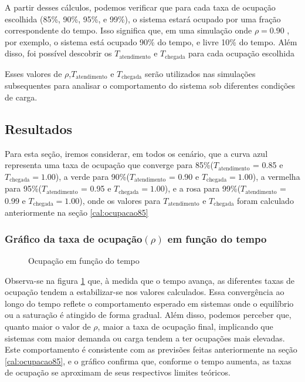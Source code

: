 A partir desses cálculos, podemos verificar que para cada taxa de ocupação escolhida (85\%, 90\%, 95\%, e 99\%), o sistema estará ocupado por uma fração correspondente do tempo. Isso significa que, em uma simulação onde $\rho = 0.90$ , por exemplo, o sistema está ocupado 90\% do tempo, e livre 10\% do tempo. Além disso, foi possível descobrir os ${T_{\text{atendimento}}}$ e ${T_{\text{chegada}}}$ para cada ocupação escolhida

Esses valores de $\rho$,${T_{\text{atendimento}}}$ e ${T_{\text{chegada}}}$ serão utilizados nas simulações subsequentes para analisar o comportamento do sistema sob diferentes condições de carga.
\subsection{Resultados}
Para esta seção, iremos considerar, em todos os cenário, que a curva azul representa uma taxa de ocupação que converge para 85\%(${T_{\text{atendimento}}}$ = 0.85 e ${T_{\text{chegada}}} = 1.00$), a verde para 90\%(${T_{\text{atendimento}}}$ = 0.90 e ${T_{\text{chegada}}} = 1.00$), a vermelha para 95\%(${T_{\text{atendimento}}}$ = 0.95 e ${T_{\text{chegada}}} = 1.00$), e a rosa para 99\%(${T_{\text{atendimento}}}$ = 0.99 e ${T_{\text{chegada}}} = 1.00$), onde os valores para ${T_{\text{atendimento}}}$ e ${T_{\text{chegada}}}$ foram calculado anteriormente na seção \ref{cal:ocupacao85}
\subsubsection{Gráfico da taxa de ocupação$(\rho)$ em função do tempo}
\begin{figure}[h!]
   \centering
   
   \caption{Ocupação em função do tempo}
   \label{fig:ocupacao}
\end{figure}

Observa-se na figura \ref{fig:ocupacao} que, à medida que o tempo avança, as diferentes taxas de ocupação tendem a estabilizar-se nos valores calculados. Essa convergência ao longo do tempo reflete o comportamento esperado em sistemas onde o equilíbrio ou a saturação é atingido de forma gradual. Além disso, podemos perceber que, quanto maior o valor de $\rho$, maior a taxa de ocupação final, implicando que sistemas com maior demanda ou carga tendem a ter ocupações mais elevadas. Este comportamento é consistente com as previsões feitas anteriormente na seção \ref{cal:ocupacao85}, e o gráfico confirma que, conforme o tempo aumenta, as taxas de ocupação se aproximam de seus respectivos limites teóricos.
